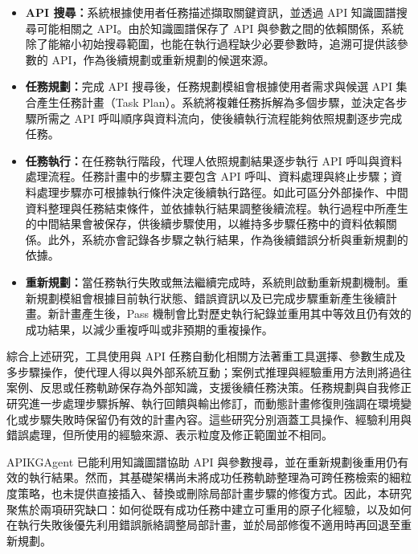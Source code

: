 \begin{itemize}
    \item \textbf{API 搜尋：}系統根據使用者任務描述擷取關鍵資訊，並透過 API 知識圖譜搜尋可能相關之 API。由於知識圖譜保存了 API 與參數之間的依賴關係，系統除了能縮小初始搜尋範圍，也能在執行過程缺少必要參數時，追溯可提供該參數的 API，作為後續規劃或重新規劃的候選來源。

    \item \textbf{任務規劃：}完成 API 搜尋後，任務規劃模組會根據使用者需求與候選 API 集合產生任務計畫（Task Plan）。系統將複雜任務拆解為多個步驟，並決定各步驟所需之 API 呼叫順序與資料流向，使後續執行流程能夠依照規劃逐步完成任務。

    \item \textbf{任務執行：}在任務執行階段，代理人依照規劃結果逐步執行 API 呼叫與資料處理流程。任務計畫中的步驟主要包含 API 呼叫、資料處理與終止步驟；資料處理步驟亦可根據執行條件決定後續執行路徑。如此可區分外部操作、中間資料整理與任務結束條件，並依據執行結果調整後續流程。執行過程中所產生的中間結果會被保存，供後續步驟使用，以維持多步驟任務中的資料依賴關係。此外，系統亦會記錄各步驟之執行結果，作為後續錯誤分析與重新規劃的依據。

    \item \textbf{重新規劃：}當任務執行失敗或無法繼續完成時，系統則啟動重新規劃機制。重新規劃模組會根據目前執行狀態、錯誤資訊以及已完成步驟重新產生後續計畫。新計畫產生後，Pass 機制會比對歷史執行紀錄並重用其中等效且仍有效的成功結果，以減少重複呼叫或非預期的重複操作。
\end{itemize}

綜合上述研究，工具使用與 API 任務自動化相關方法著重工具選擇、參數生成及多步驟操作，使代理人得以與外部系統互動；案例式推理與經驗重用方法則將過往案例、反思或任務軌跡保存為外部知識，支援後續任務決策。任務規劃與自我修正研究進一步處理步驟拆解、執行回饋與輸出修訂，而動態計畫修復則強調在環境變化或步驟失敗時保留仍有效的計畫內容。這些研究分別涵蓋工具操作、經驗利用與錯誤處理，但所使用的經驗來源、表示粒度及修正範圍並不相同。

APIKGAgent 已能利用知識圖譜協助 API 與參數搜尋，並在重新規劃後重用仍有效的執行結果。然而，其基礎架構尚未將成功任務軌跡整理為可跨任務檢索的細粒度策略，也未提供直接插入、替換或刪除局部計畫步驟的修復方式。因此，本研究聚焦於兩項研究缺口：如何從既有成功任務中建立可重用的原子化經驗，以及如何在執行失敗後優先利用錯誤脈絡調整局部計畫，並於局部修復不適用時再回退至重新規劃。
